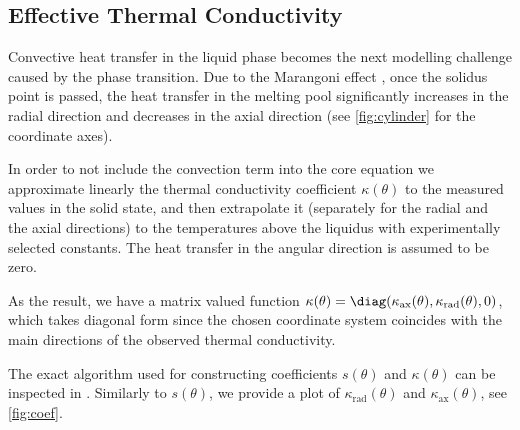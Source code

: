 \subsection{Effective Thermal Conductivity}
\label{subsec:conductivity}

Convective heat transfer in the liquid phase becomes the next modelling challenge caused by the phase transition. Due to the Marangoni effect , once the solidus point is passed, the heat transfer in the melting pool significantly increases in the radial direction and decreases in the axial direction (see \cref{fig:cylinder} for the coordinate axes).

In order to not include the convection term into the core equation we approximate linearly the thermal conductivity coefficient $\kappa(\theta)$ to the measured values in the solid state, and then extrapolate it (separately for the radial and the axial directions) to the temperatures above the liquidus with experimentally selected constants. The heat transfer in the angular direction is assumed to be zero.

As the result, we have a matrix valued function $\kappa(\theta) = \diag(\kappa_\text{ax}(\theta), \kappa_\text{rad}(\theta), 0)$, which takes diagonal form since the chosen coordinate system coincides with the main directions of the observed thermal conductivity.




The exact algorithm used for constructing coefficients $s(\theta)$ and $\kappa(\theta)$ can be inspected in . Similarly to $s(\theta)$, we provide a plot of $\kappa_\text{rad}(\theta)$ and $\kappa_\text{ax}(\theta)$, see \cref{fig:coef}.

